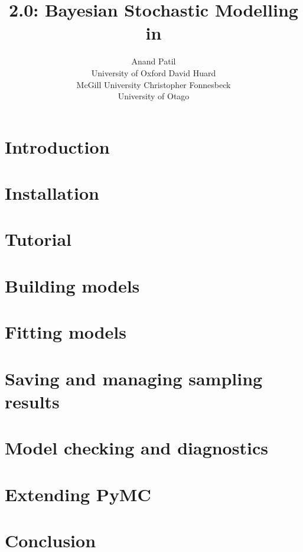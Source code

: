 \documentclass[]{jss_mod}
\author{Anand Patil\\University of Oxford \And 
        David Huard\\McGill University  \And
		Christopher Fonnesbeck\\University of Otago}
\title{\pkg{PyMC} 2.0: Bayesian Stochastic Modelling in \proglang{Python}}
\begin{document}

\section[Introduction]{Introduction} 
\label{sec:intro} 


\section[Installation]{Installation} 
\label{sec:install} 


\section[Tutorial]{Tutorial}
\label{sec:tutorial}


\section[Building Models]{Building models}
\label{sec:modelbuilding} 


\section[Fitting Models]{Fitting models}
\label{sec:modelfitting}


\section[Sampling Results]{Saving and managing sampling results}
\label{sec:database} 


\section[Model Checking]{Model checking and diagnostics} 
\label{sec:modelchecking}


\section[Extending PyMC]{Extending PyMC}
\label{sec:extending}



\section{Conclusion}
\label{conclusion}

\end{document}
